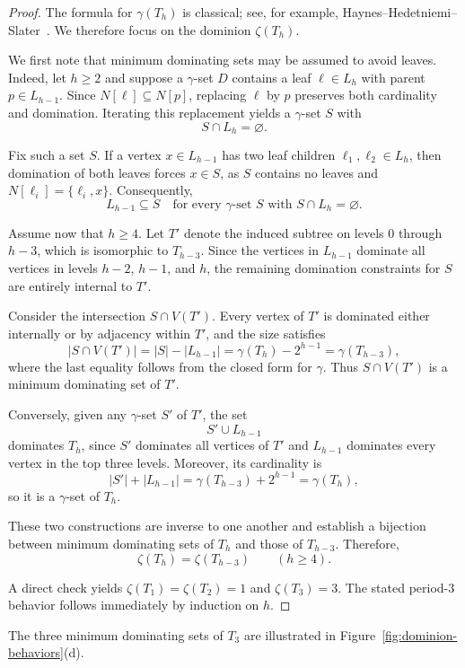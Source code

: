 \documentclass[11pt]{article}
\theoremstyle{definition}
\theoremstyle{remark}
\begin{document}
\begin{proof}
The formula for $\gamma(T_h)$ is classical; see, for example,
Haynes--Hedetniemi--Slater~\cite{HaynesHedetniemiSlater1998}.
We therefore focus on the dominion $\zeta(T_h)$.

We first note that minimum dominating sets may be assumed to avoid leaves.
Indeed, let $h\ge 2$ and suppose a $\gamma$-set $D$ contains a leaf
$\ell\in L_h$ with parent $p\in L_{h-1}$.
Since $N[\ell]\subseteq N[p]$, replacing $\ell$ by $p$ preserves both
cardinality and domination.
Iterating this replacement yields a $\gamma$-set $S$ with
\[
S\cap L_h=\varnothing .
\]

Fix such a set $S$.
If a vertex $x\in L_{h-1}$ has two leaf children $\ell_1,\ell_2\in L_h$,
then domination of both leaves forces $x\in S$, as $S$ contains no leaves
and $N[\ell_i]=\{\ell_i,x\}$.
Consequently,
\[
L_{h-1}\subseteq S
\quad\text{for every $\gamma$-set $S$ with $S\cap L_h=\varnothing$.}
\]

Assume now that $h\ge 4$.
Let $T'$ denote the induced subtree on levels $0$ through $h-3$,
which is isomorphic to $T_{h-3}$.
Since the vertices in $L_{h-1}$ dominate all vertices in levels
$h-2$, $h-1$, and $h$, the remaining domination constraints for $S$
are entirely internal to $T'$.

Consider the intersection $S\cap V(T')$.
Every vertex of $T'$ is dominated either internally or by adjacency
within $T'$, and the size satisfies
\[
|S\cap V(T')|
=|S|-|L_{h-1}|
=\gamma(T_h)-2^{h-1}
=\gamma(T_{h-3}),
\]
where the last equality follows from the closed form for $\gamma$.
Thus $S\cap V(T')$ is a minimum dominating set of $T'$.

Conversely, given any $\gamma$-set $S'$ of $T'$, the set
\[
S'\cup L_{h-1}
\]
dominates $T_h$, since $S'$ dominates all vertices of $T'$
and $L_{h-1}$ dominates every vertex in the top three levels.
Moreover, its cardinality is
\[
|S'|+|L_{h-1}|=\gamma(T_{h-3})+2^{h-1}=\gamma(T_h),
\]
so it is a $\gamma$-set of $T_h$.

These two constructions are inverse to one another and establish a
bijection between minimum dominating sets of $T_h$ and those of $T_{h-3}$.
Therefore,
\[
\zeta(T_h)=\zeta(T_{h-3}) \qquad (h\ge 4).
\]

A direct check yields $\zeta(T_1)=\zeta(T_2)=1$ and $\zeta(T_3)=3$.
The stated period-$3$ behavior follows immediately by induction on $h$.
\end{proof}

The three minimum dominating sets of $T_3$ are illustrated in
Figure~\ref{fig:dominion-behaviors}(d).
\end{document}
